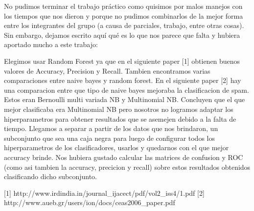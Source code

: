 No pudimos terminar el trabajo práctico como quisimos por malos manejos con los tiempos que nos dieron y porque no pudimos combinarlos de la mejor forma entre los integrantes del grupo (a causa de parciales, trabajo, entre otras cosas). Sin embargo, dejamos escrito aquí qué es lo que nos parece que falta y hubiera aportado mucho a este trabajo:

Elegimos usar Random Forest ya que en el siguiente paper [1] obtienen buenos valores de Accuracy, Precision y Recall. Tambien encontramos varias comparaciones entre naive bayes y random forest. En el siguiente paper [2] hay una comparacion entre que tipo de naive bayes mejoraba la clasificacion de spam. Estos eran Bernoulli multi variada NB y Multinomial NB. Concluyen que el que mejor clasificaba era Multinomial NB pero nosotros no logramos adaptar los hiperparametros para obtener resultados que se asemejen debido a la falta de tiempo. Llegamos a separar a partir de los datos que nos brindaron, un subconjunto que sea una caja negra para luego de configurar todos los hiperparametros de los clasificadores, usarlos y quedarnos con el que mejor accuracy brinde. Nos hubiera gustado calcular las matrices de confusion y ROC (como asi tambien la accuracy, precicion y recall) sobre estos resultados obtenidos clasificando dicho subconjunto.


[1] http://www.irdindia.in/journal_ijacect/pdf/vol2_iss4/1.pdf
[2] http://www.aueb.gr/users/ion/docs/ceas2006_paper.pdf